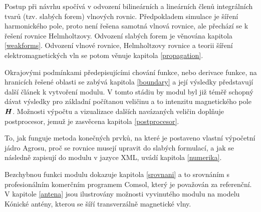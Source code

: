 \documentclass[12pt,a4paper,oneside]{article}
\numberwithin{equation}{section} %
\numberwithin{figure}{section} %
\numberwithin{table}{section} %
\renewcommand{\vec}[1]{\mbox{\boldmath$#1$}} %
\begin{document}
Postup při návrhu spočívá v odvození bilineárních a lineárních členů integrálních tvarů (tzv. slabých forem) vlnových rovnic. Předpokladem simulace je šíření harmonického pole, proto není řešena samotná vlnová rovnice, ale přechází se k řešení rovnice Helmholtzovy. Odvození slabých forem je věnována kapitola \ref{weakforms}. Odvození vlnové rovnice, Helmholtzovy rovnice a teorii šíření elektromagnetických vln se potom věnuje kapitola \ref{propagation}.

Okrajovými podmínkami předepisujícími chování funkce, nebo derivace funkce, na hranicích řešené oblasti se zabývá kapitola \ref{boundary} a její výsledky představují další článek k vytvoření modulu. V tomto stádiu by modul byl již téměř schopný dávat výsledky pro základní počítanou veličinu a to intenzitu magnetického pole $\vec{H}$. Možnosti výpočtu a vizualizace dalších navázaných veličin doplňuje postprocesor, jemuž je zasvěcena kapitola \ref{postprocesor}.

To, jak funguje metoda konečných prvků, na které je postaveno vlastní výpočetní jádro Agrosu, proč se rovnice musejí upravit do slabých formulací, a jak se následně zapisují do modulu v jazyce XML, uvádí kapitola \ref{numerika}.

Bezchybnou funkci modulu dokazuje kapitola \ref{srovnani} a to srovnáním s profesionálním komerčním programem Comsol, který je považován za referenční. V kapitole \ref{antena} jsou ilustrovány možnosti vyvinutého modulu na modelu Kónické antény, kterou se šíří transverzálně magnetické vlny.



\newpage
\end{document}
